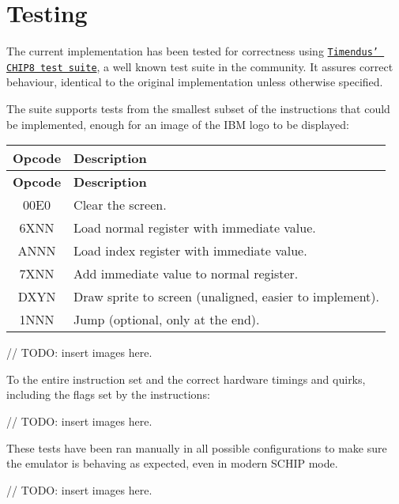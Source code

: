 \section{Testing}
\label{sec:ch3sec5}

\par The current implementation has been tested for correctness using \href{https://github.com/Timendus/chip8-test-suite}{\texttt{Timendus' CHIP8 test suite}}, a well known test suite in the community. It assures correct behaviour, identical to the original implementation unless otherwise specified. 

\par The suite supports tests from the smallest subset of the instructions that could be implemented, enough for an image of the IBM logo to be displayed:

\begin{longtable}{|c|l|}
\hline
\textbf{Opcode} & \textbf{Description} \\ \hline
\endfirsthead

\hline
\textbf{Opcode} & \textbf{Description} \\ \hline
\endhead

\hline
\endfoot

\hline
\endlastfoot

00E0 & Clear the screen.                                        \\ \hline
6XNN & Load normal register with immediate value.               \\ \hline
ANNN & Load index register with immediate value.                \\ \hline
7XNN & Add immediate value to normal register.                  \\ \hline
DXYN & Draw sprite to screen (unaligned, easier to implement).  \\ \hline
1NNN & Jump (optional, only at the end).                        \\
\end{longtable}
// TODO: insert images here.

\par To the entire instruction set and the correct hardware timings and quirks, including the flags set by the instructions:

// TODO: insert images here.

\par These tests have been ran manually in all possible configurations to make sure the emulator is behaving as expected, even in modern SCHIP mode.

// TODO: insert images here.